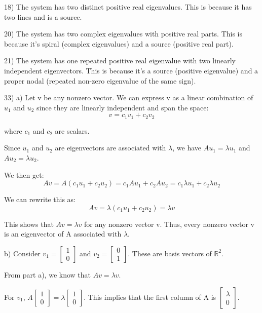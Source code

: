 \documentclass{article}
\newcommand{\RR}{\mathbb{R}}
\begin{document}
18) The system has two distinct positive real eigenvalues.
This is because it has two lines and is a source.


20) The system has two complex eigenvalues with positive real parts.
This is because it's spiral (complex eigenvalues) and a source (positive real part).


21) The system has one repeated positive real eigenvalue with two linearly
independent eigenvectors. This is because it's a source (positive eigenvalue)
and a proper nodal (repeated non-zero eigenvalue of the same sign).


33) a) Let v be any nonzero vector. We can express v as a linear
combination of $u_1$ and $u_2$ since they are linearly independent
and span the space:
\[v = c_1 v_1 + c_2 v_2\]

where $c_1$ and $c_2$ are scalars.

Since $u_1$ and $u_2$ are eigenvectors are associated with $\lambda$,
we have $A u_1 = \lambda u_1$ and $A u_2 = \lambda u_2$.

We then get:
\[A v = A(c_1 u_1 + c_2 u_2) = c_1 A u_1 + c_2 A u_2 = c_1 \lambda u_1 + c_2 \lambda u_2\]

We can rewrite this as:
\[A v = \lambda (c_1 u_1 + c_2 u_2) = \lambda v\]

This shows that $A v = \lambda v$ for any nonzero vector v. Thus,
every nonzero vector v is an eigenvector of A associated with $\lambda$.

b) Consider $v_1 = \begin{bmatrix}
    1 \\
    0
\end{bmatrix}$ and $v_2 = \begin{bmatrix}
    0 \\
    1
\end{bmatrix}$. These are basis vectors of $\RR^2$.

From part a), we know that $A v = \lambda v$.

For $v_1$,
$A \begin{bmatrix}
    1 \\
    0
\end{bmatrix} = \lambda \begin{bmatrix}
    1 \\
    0
\end{bmatrix}$. This implies that the first column of A
is $\begin{bmatrix}
    \lambda \\
    0
\end{bmatrix}$.
\end{document}
